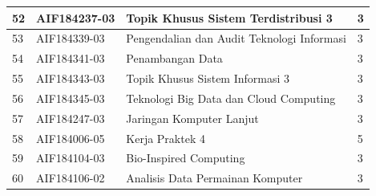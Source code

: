 \begin{table}[H]
\begin{tabular}{|p{0.5cm}|p{2.85cm}|p{4.95cm}|p{2.7cm}|}
52 & AIF184237-03 & Topik Khusus Sistem Terdistribusi 3          & 3 \\ \hline
53 & AIF184339-03 & Pengendalian dan Audit Teknologi Informasi   & 3 \\ \hline
54 & AIF184341-03 & Penambangan Data                             & 3 \\ \hline
55 & AIF184343-03 & Topik Khusus Sistem Informasi 3              & 3 \\ \hline
56 & AIF184345-03 & Teknologi Big Data dan Cloud Computing       & 3 \\ \hline
57 & AIF184247-03 & Jaringan Komputer Lanjut                     & 3 \\ \hline
58 & AIF184006-05 & Kerja Praktek 4                              & 5 \\ \hline
59 & AIF184104-03 & Bio-Inspired Computing                       & 3 \\ \hline
60 & AIF184106-02 & Analisis Data Permainan Komputer             & 3 \\ \hline
		\end{tabular}
	\label{tab:kuliahpilihan_2}
\end{table}

